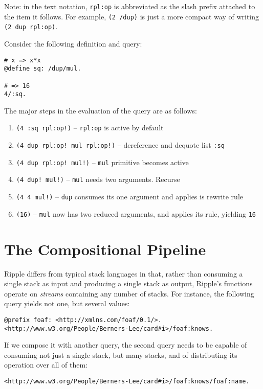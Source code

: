 \documentclass[runningheads]{llncs}
\begin{document}
Note: in the text notation, \texttt{rpl:op} is abbreviated as the slash prefix attached to the item it follows.  For example, \texttt{(2 /dup)} is just a more compact way of writing \texttt{(2 dup rpl:op)}.

Consider the following definition and query:

\begin{verbatim}
# x => x*x
@define sq: /dup/mul.

# => 16
4/:sq.
\end{verbatim}
The major steps in the evaluation of the query are as follows:
\begin{enumerate}
\item \texttt{(4 :sq rpl:op!)} -- \texttt{rpl:op} is active by default
\item \texttt{(4 dup rpl:op! mul rpl:op!)} -- dereference and dequote list \texttt{:sq}
\item \texttt{(4 dup rpl:op! mul!)} -- \texttt{mul} primitive becomes active
\item \texttt{(4 dup! mul!)} -- \texttt{mul} needs two arguments.  Recurse
\item \texttt{(4 4 mul!)} -- \texttt{dup} consumes its one argument and applies is rewrite rule
\item \texttt{(16)} -- \texttt{mul} now has two reduced arguments, and applies its rule, yielding \texttt{16}
\end{enumerate}

\section{The Compositional Pipeline}

Ripple differs from typical stack languages in that, rather than consuming a single stack as input and producing a single stack as output, Ripple's functions operate on \textit{streams} containing any number of stacks.  For instance, the following query yields not one, but several values:
\begin{verbatim}
@prefix foaf: <http://xmlns.com/foaf/0.1/>.
<http://www.w3.org/People/Berners-Lee/card#i>/foaf:knows.
\end{verbatim}

If we compose it with another query, the second query needs to be capable of consuming not just a single stack, but many stacks, and of distributing its operation over all of them:
\begin{verbatim}
<http://www.w3.org/People/Berners-Lee/card#i>/foaf:knows/foaf:name.
\end{verbatim}
\end{document}
